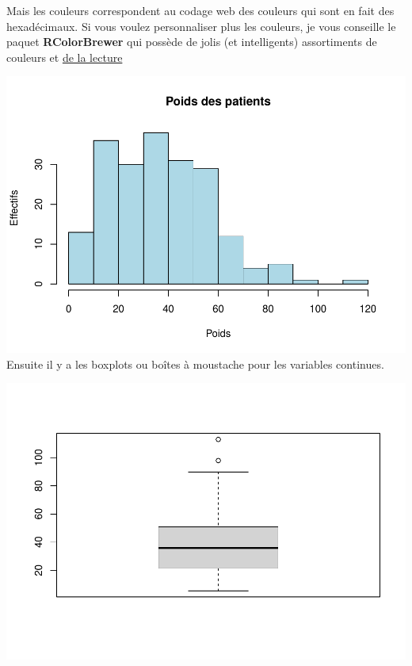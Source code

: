 \documentclass[
]{book}
\newenvironment{Shaded}{\begin{snugshade}}{\end{snugshade}}
\newcommand{\AttributeTok}[1]{\textcolor[rgb]{0.13,0.29,0.53}{#1}}
\newcommand{\FunctionTok}[1]{\textcolor[rgb]{0.13,0.29,0.53}{\textbf{#1}}}
\newcommand{\NormalTok}[1]{#1}
\newcommand{\SpecialCharTok}[1]{\textcolor[rgb]{0.81,0.36,0.00}{\textbf{#1}}}
\newcommand{\StringTok}[1]{\textcolor[rgb]{0.31,0.60,0.02}{#1}}
\begin{document}
Mais les couleurs correspondent au codage web des couleurs qui sont en fait des
hexadécimaux. Si vous voulez personnaliser plus les couleurs, je vous conseille
le paquet \textbf{RColorBrewer} qui possède de jolis (et intelligents) assortiments
de couleurs et \href{https://larmarange.github.io/analyse-R/couleurs.html}{de la lecture}

\begin{Shaded}
\end{Shaded}

\includegraphics{_main_files/figure-latex/unnamed-chunk-74-1.pdf}
Ensuite il y a les boxplots ou boîtes à moustache pour les variables continues.

\begin{Shaded}
\end{Shaded}

\includegraphics{_main_files/figure-latex/poids4-1.pdf}
\end{document}
